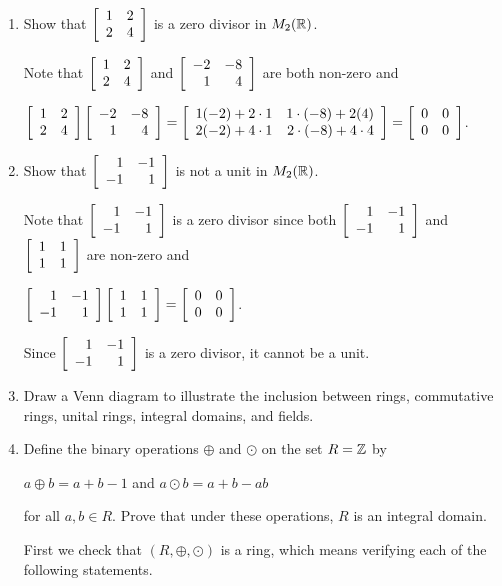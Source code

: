 \documentclass[11pt,fleqn,dvipsnames,usenames]{article}
\begin{document}
\begin{enumerate}[1.]
\item Show that $\MATRIX{rr}{1 & 2\\2 & 4}$ is a zero divisor in $M_{2}(\REAL)$.
\vsmsp

\solution
Note that $\MATRIX{rr}{1 & 2\\2 & 4}$ and $\MATRIX{rr}{-2& -8\\1&4}$ are both non-zero and
\begin{center}
$\MATRIX{rr}{1 & 2\\2 & 4} \MATRIX{rr}{-2& -8\\1&4}= \MATRIX{rr}{1(-2) + 2\cdot 1 & 1\cdot (-8) + 2(4)\\2(-2) + 4\cdot 1 & 2\cdot(-8) + 4\cdot 4} = \MATRIX{rr}{0 & 0\\0 &0}$.
\end{center}
\item Show that $\MATRIX{rr}{1 & -1\\-1 & 1}$ is not a unit in $M_{2}(\REAL)$.
\vsmsp

\solution Note that $\MATRIX{rr}{1 & -1\\-1 & 1}$ is a zero divisor since both $\MATRIX{rr}{1 & -1\\-1 & 1}$ and $\MATRIX{rr}{1 & 1\\1 & 1}$ are non-zero and
\begin{center}
$\MATRIX{rr}{1 & -1\\-1 & 1}\MATRIX{rr}{1 & 1\\1 & 1} = \MATRIX{rr}{0 & 0\\0 & 0}$.
\end{center}
Since $\MATRIX{rr}{1 & -1\\-1 & 1}$ is a zero divisor, it cannot be a unit.

\item Draw a Venn diagram to illustrate the inclusion between rings, commutative rings, unital rings, integral domains, and fields.

\item Define the binary operations $\oplus$ and $\odot$ on the set $R=\Z$ by
\begin{center}
$a\oplus b = a + b - 1$ and $a\odot b = a + b - ab$
\end{center}
for all $a,b\in R$.  Prove that under these operations, $R$ is an integral domain.
\smsp

\solution First we check that $(R,\oplus,\odot)$ is a ring, which means verifying each of the following statements.


\end{enumerate}
\end{document}
